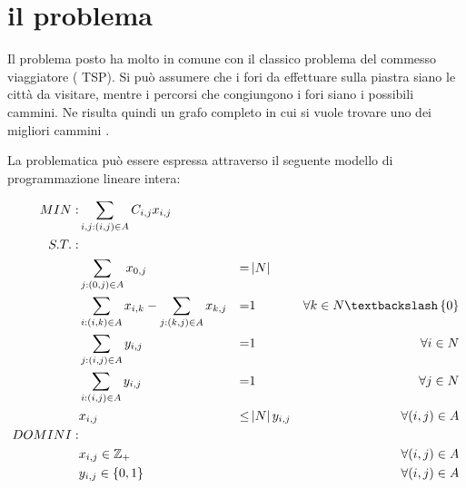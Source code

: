 %
%
\section[Il problema]{il problema}
\label{pt1:problem}
Il problema posto ha molto in comune con il classico problema del commesso viaggiatore ( TSP). Si può assumere che i fori da effettuare sulla piastra siano le città da visitare, mentre i percorsi che congiungono i fori siano i possibili cammini. Ne risulta quindi un grafo completo in cui si vuole trovare uno dei migliori cammini .

La problematica può essere espressa attraverso il seguente modello di programmazione lineare intera:

\begin{align}
MIN: &\sum_{i,j:(i,j) \in A} C_{i,j}x_{i,j} \\
S.T.: \nonumber \\ 
&\sum_{j:(0,j) \in A} x_{0,j} &=&\left|N\right|& \\
&\sum_{i:(i,k) \in A} x_{i,k} - \sum_{j:(k,j) \in A} x_{k,j} &=&1 &\forall k \in N \textbackslash \left\{0\right\} \\
&\sum_{j:(i,j) \in A} y_{i,j} &=&1 &\forall i \in N \\
&\sum_{i:(i,j) \in A} y_{i,j} &=&1 &\forall j \in N \\
&x_{i,j} &\le&\left|N\right|y_{i,j} &\forall (i,j) \in A\\
DOMINI: \nonumber \\ 
&x_{i,j} \in \mathbb{Z}_{+} &&& \forall (i,j) \in A\\
&y_{i,j} \in \left\{0, 1\right\} &&& \forall (i, j) \in A
\end{align}